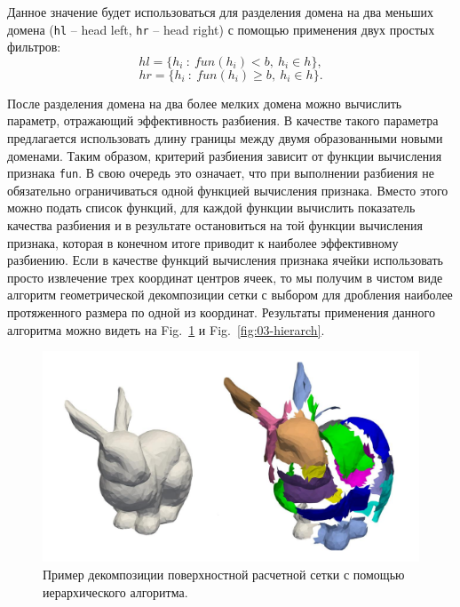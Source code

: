 \documentclass[
11pt,%
tightenlines,%
twoside,%
onecolumn,%
nofloats,%
nobibnotes,%
nofootinbib,%
superscriptaddress,%
noshowpacs,%
centertags]%
{revtex4}
\begin{document}
Данное значение будет использоваться для разделения домена на два меньших домена (\texttt{hl} -- head left, \texttt{hr} -- head right) с помощью применения двух простых фильтров:
\begin{equation*}
	hl = \{h_i~:~fun(h_i) < b,~h_i \in h\},
\end{equation*}
\begin{equation*}
	hr = \{h_i~:~fun(h_i) \geq b,~h_i \in h\}.
\end{equation*}

После разделения домена на два более мелких домена можно вычислить параметр, отражающий эффективность разбиения.
В качестве такого параметра предлагается использовать длину границы между двумя образованными новыми доменами.
Таким образом, критерий разбиения зависит от функции вычисления признака \texttt{fun}.
В свою очередь это означает, что при выполнении разбиения не обязательно ограничиваться одной функцией вычисления признака. Вместо этого можно подать список функций, для каждой функции вычислить показатель качества разбиения и в результате остановиться на той функции вычисления признака, которая в конечном итоге приводит к наиболее эффективному разбиению.
Если в качестве функций вычисления признака ячейки использовать просто извлечение трех координат центров ячеек, то мы получим в чистом виде алгоритм геометрической декомпозиции сетки с выбором для дробления наиболее протяженного размера по одной из координат.
Результаты применения данного алгоритма можно видеть на Fig.~\ref{fig:03-explode-bunny} и Fig.~\ref{fig:03-hierarch}.

\begin{figure}[h]
\includegraphics[width=1.0\textwidth]{pics/03-explode-bunny.pdf}
\caption{Пример декомпозиции поверхностной расчетной сетки с помощью иерархического алгоритма.}\label{fig:03-explode-bunny}
\end{figure}
\end{document}
